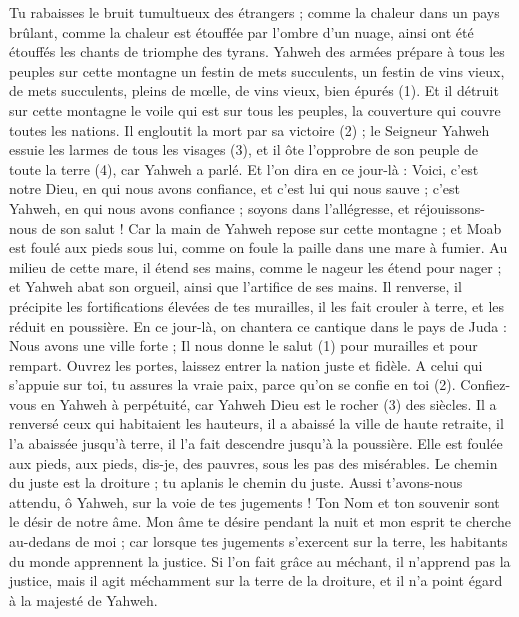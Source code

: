 \begin{multicols}{2}
Tu rabaisses le bruit tumultueux des étrangers ; comme la chaleur dans un pays brûlant, comme la chaleur est étouffée par l'ombre d’un nuage, ainsi ont été étouffés les chants de triomphe des tyrans.
Yahweh des armées prépare à tous les peuples sur cette montagne un festin de mets succulents, un festin de vins vieux, de mets succulents, pleins de mœlle, de vins vieux, bien épurés (1).
Et il détruit sur cette montagne le voile qui est sur tous les peuples, la couverture qui couvre toutes les nations.
Il engloutit la mort par sa victoire (2) ; le Seigneur Yahweh essuie les larmes de tous les visages (3), et il ôte l'opprobre de son peuple de toute la terre (4), car Yahweh a parlé.
Et l'on dira en ce jour-là : Voici, c'est notre Dieu, en qui nous avons confiance, et c’est lui qui nous sauve ; c'est Yahweh, en qui nous avons confiance ; soyons dans l’allégresse, et réjouissons-nous de son salut !
Car la main de Yahweh repose sur cette montagne ; et Moab est foulé aux pieds sous lui, comme on foule la paille dans une mare à fumier.
Au milieu de cette mare, il étend ses mains, comme le nageur les étend pour nager ; et Yahweh abat son orgueil, ainsi que l’artifice de ses mains.
Il renverse, il précipite les fortifications élevées de tes murailles, il les fait crouler à terre, et les réduit en poussière.
\VerseOne{}En ce jour-là, on chantera ce cantique dans le pays de Juda : Nous avons une ville forte ; Il nous donne le salut (1) pour murailles et pour rempart.
Ouvrez les portes, laissez entrer la nation juste et fidèle.
A celui qui s’appuie sur toi, tu assures la vraie paix, parce qu’on se confie en toi (2).
Confiez-vous en Yahweh à perpétuité, car Yahweh Dieu est le rocher (3) des siècles.
Il a renversé ceux qui habitaient les hauteurs, il a abaissé la ville de haute retraite, il l’a abaissée jusqu'à terre, il l’a fait descendre jusqu'à la poussière.
Elle est foulée aux pieds, aux pieds, dis-je, des pauvres, sous les pas des misérables.
Le chemin du juste est la droiture ; tu aplanis le chemin du juste.
Aussi t'avons-nous attendu, ô Yahweh, sur la voie de tes jugements ! Ton Nom et ton souvenir sont le désir de notre âme.
Mon âme te désire pendant la nuit et mon esprit te cherche au-dedans de moi ; car lorsque tes jugements s’exercent sur la terre, les habitants du monde apprennent la justice.
Si l’on fait grâce au méchant, il n’apprend pas la justice, mais il agit méchamment sur la terre de la droiture, et il n’a point égard à la majesté de Yahweh.

\end{multicols}
